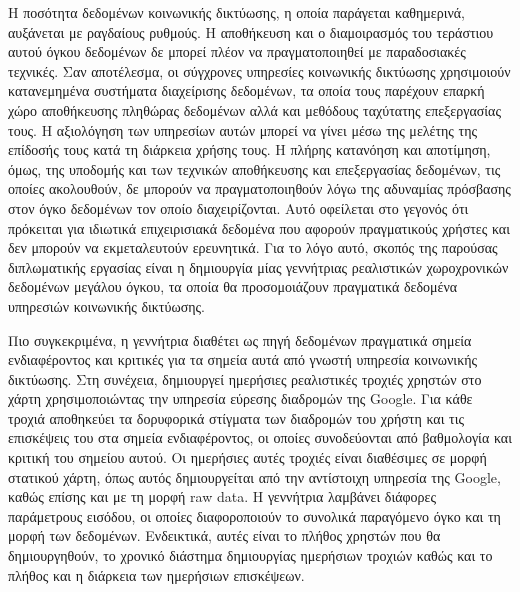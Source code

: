 
\begin{abstractgr}%

Η ποσότητα δεδομένων κοινωνικής δικτύωσης, η οποία παράγεται καθημερινά, αυξάνεται με ραγδαίους ρυθμούς. Η αποθήκευση και ο διαμοιρασμός του τεράστιου αυτού όγκου δεδομένων 
δε μπορεί πλέον να πραγματοποιηθεί με παραδοσιακές τεχνικές. Σαν αποτέλεσμα, οι σύγχρονες υπηρεσίες κοινωνικής δικτύωσης χρησιμοιούν κατανεμημένα συστήματα 
διαχείρισης δεδομένων, 
τα οποία τους παρέχουν επαρκή χώρο αποθήκευσης πληθώρας δεδομένων αλλά και μεθόδους ταχύτατης επεξεργασίας τους. Η αξιολόγηση των υπηρεσίων αυτών μπορεί να γίνει 
μέσω της μελέτης της επίδοσής τους κατά τη διάρκεια χρήσης τους. Η πλήρης κατανόηση και αποτίμηση, όμως, της \linebreak υποδομής και των τεχνικών αποθήκευσης και επεξεργασίας δεδομένων, τις 
οποίες ακολουθούν, δε μπορούν να πραγματοποιηθούν λόγω της αδυναμίας πρόσβασης στον όγκο δεδομένων τον οποίο διαχειρίζονται. 
Αυτό οφείλεται στο γεγονός ότι πρόκειται για ιδιωτικά επιχειρισιακά δεδομένα που αφορούν πραγματικούς χρήστες και δεν μπορούν να 
εκμεταλευτούν ερευνητικά. Για το λόγο αυτό, σκοπός της 
παρούσας διπλωματικής εργασίας είναι η δημιουργία μίας γεννήτριας ρεαλιστικών \linebreak χωροχρονικών δεδομένων μεγάλου όγκου, τα οποία θα προσομοιάζουν πραγματικά δεδομένα 
\linebreak υπηρεσιών κοινωνικής δικτύωσης. 

Πιο συγκεκριμένα, η γεννήτρια διαθέτει ως πηγή δεδομένων πραγματικά σημεία ενδιαφέροντος και κριτικές για τα σημεία αυτά από γνωστή υπηρεσία κοινωνικής δικτύωσης. 
Στη συνέχεια, \linebreak δημιουργεί ημερήσιες ρεαλιστικές τροχιές χρηστών στο χάρτη χρησιμοποιώντας την υπηρεσία \linebreak εύρεσης διαδρομών της Google. Για κάθε τροχιά αποθηκεύει 
τα δορυφορικά στίγματα των διαδρομών του χρήστη και τις επισκέψεις του στα σημεία ενδιαφέροντος, οι οποίες συνοδεύονται από βαθμολογία και κριτική του σημείου αυτού. 
Οι ημερήσιες αυτές τροχιές είναι διαθέσιμες σε μορφή στατικού χάρτη, όπως αυτός δημιουργείται από την αντίστοιχη υπηρεσία της Google, 
καθώς επίσης και με τη μορφή raw data. Η γεννήτρια λαμβάνει διάφορες 
παράμετρους εισόδου, οι οποίες διαφοροποιούν το συνολικά παραγόμενο όγκο και τη μορφή των δεδομένων. Ενδεικτικά, αυτές είναι το πλήθος χρηστών που θα δημιουργηθούν, το 
χρονικό διάστημα δημιουργίας ημερήσιων τροχιών καθώς και το πλήθος και η διάρκεια των ημερήσιων επισκέψεων. 


\end{abstractgr}
